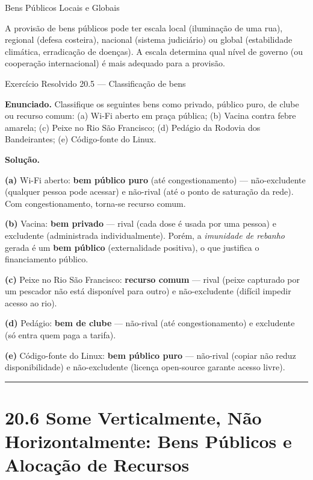 \documentclass[11pt,twoside,openright]{book}
\begin{document}
\begin{notebox}{Bens Públicos Locais e Globais}

A provisão de bens públicos pode ter escala local (iluminação de uma
rua), regional (defesa costeira), nacional (sistema judiciário) ou
global (estabilidade climática, erradicação de doenças). A escala
determina qual nível de governo (ou cooperação internacional) é mais
adequado para a provisão.

\end{notebox}

\begin{exresolvidobox}{Exercício Resolvido 20.5 — Classificação de bens}

\textbf{Enunciado.} Classifique os seguintes bens como privado, público
puro, de clube ou recurso comum: (a) Wi-Fi aberto em praça pública; (b)
Vacina contra febre amarela; (c) Peixe no Rio São Francisco; (d) Pedágio
da Rodovia dos Bandeirantes; (e) Código-fonte do Linux.

\textbf{Solução.}

\textbf{(a)} Wi-Fi aberto: \textbf{bem público puro} (até
congestionamento) --- não-excludente (qualquer pessoa pode acessar) e
não-rival (até o ponto de saturação da rede). Com congestionamento,
torna-se recurso comum.

\textbf{(b)} Vacina: \textbf{bem privado} --- rival (cada dose é usada
por uma pessoa) e excludente (administrada individualmente). Porém, a
\emph{imunidade de rebanho} gerada é um \textbf{bem público}
(externalidade positiva), o que justifica o financiamento público.

\textbf{(c)} Peixe no Rio São Francisco: \textbf{recurso comum} ---
rival (peixe capturado por um pescador não está disponível para outro) e
não-excludente (difícil impedir acesso ao rio).

\textbf{(d)} Pedágio: \textbf{bem de clube} --- não-rival (até
congestionamento) e excludente (só entra quem paga a tarifa).

\textbf{(e)} Código-fonte do Linux: \textbf{bem público puro} ---
não-rival (copiar não reduz disponibilidade) e não-excludente (licença
open-source garante acesso livre).

\end{exresolvidobox}

\begin{center}\rule{0.5\linewidth}{0.5pt}\end{center}

\section{20.6 Some Verticalmente, Não Horizontalmente: Bens Públicos e
Alocação de Recursos}\label{206}
\end{document}
